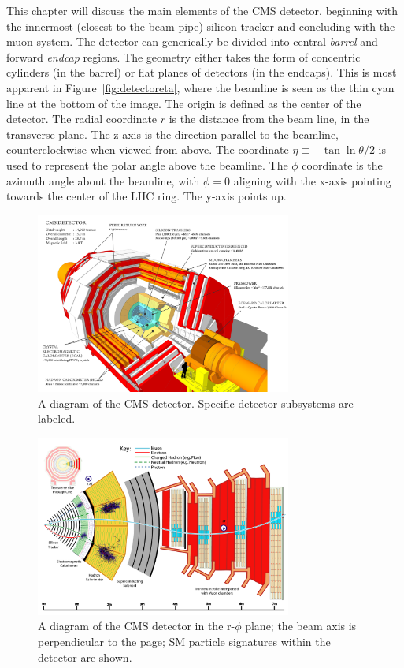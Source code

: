 This chapter will discuss the main elements of the CMS detector, beginning with the innermost (closest to the beam pipe) silicon tracker and concluding with the muon system. The detector can generically be divided into central \textit{barrel} and forward \textit{endcap} regions. The geometry either takes the form of concentric cylinders (in the barrel) or flat planes of detectors (in the endcaps). This is most apparent in Figure~\ref{fig:detectoreta}, where the beamline is seen as the thin cyan line at the bottom of the image. The origin is defined as the center of the detector. The radial coordinate $r$ is the distance from the beam line, in the transverse plane. The z axis is the direction parallel to the beamline, counterclockwise when viewed from above. The coordinate $\eta\equiv-\tan{\ln{\theta/2}}$ is used to represent the polar angle above the beamline. The $\phi$ coordinate is the azimuth angle about the beamline, with $\phi=0$ aligning with the x-axis pointing towards the center of the LHC ring. The y-axis points up.

\begin{figure}
\centering
\includegraphics[width=0.75\textwidth]{figs/howcmsworks.png}
\caption[A diagram of the CMS detector.]{A diagram of the CMS detector. Specific detector subsystems are labeled.}
\label{fig:howcmsworks}
\end{figure}

\begin{figure}
\centering
\includegraphics[width=0.75\textwidth]{figs/CMS-PRF-14-001_Figure_001.pdf}
\caption[A diagram of the CMS detector in the r-$\phi$ plane; particle signatures are shown.]{A diagram of the CMS detector in the r-$\phi$ plane; the beam axis is perpendicular to the page; SM particle signatures within the detector are shown.}
\label{fig:schematicview}
\end{figure}

